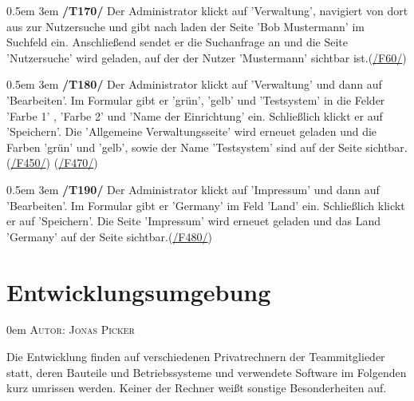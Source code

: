 \documentclass{article}
\makeatletter
\newcommand{\sectionauthor}[1]{
	{\parindent 0em \large \scshape Autor: #1 \par \nobreak \vspace*{2em}}
	\@afterheading
}
\newcommand{\specification}[3]{
	{\parindent 0.5em \hangindent 3em \hypertarget{spec:#1:#2}{\textbf{/#1#2/}} #3 \par \nobreak \vspace*{0.5em}}
}
\makeatother
\begin{document}
\specification{T}{170}{Der Administrator klickt auf 'Verwaltung', navigiert von dort aus zur Nutzersuche und gibt nach laden der Seite 'Bob Mustermann' im Suchfeld ein. Anschließend sendet er die Suchanfrage an und die Seite 'Nutzersuche' wird geladen, auf der der Nutzer 'Mustermann' sichtbar ist.(\hyperlink{spec:F:60}{/F60/})}
\specification{T}{180}{Der Administrator klickt auf 'Verwaltung' und dann auf 'Bearbeiten'. Im Formular gibt er 'grün', 'gelb' und 'Testsystem' in die Felder 'Farbe 1' , 'Farbe 2' und 'Name der Einrichtung' ein. Schließlich klickt er auf 'Speichern'. Die 'Allgemeine Verwaltungsseite' wird erneuet geladen und die Farben 'grün' und 'gelb', sowie der Name 'Testsystem' sind auf der Seite sichtbar. (\hyperlink{spec:F:450}{/F450/}) (\hyperlink{spec:F:470}{/F470/})}
\specification{T}{190}{Der Administrator klickt auf 'Impressum' und dann auf 'Bearbeiten'. Im Formular gibt er 'Germany' im Feld 'Land' ein. Schließlich klickt er auf 'Speichern'. Die Seite 'Impressum' wird erneuet geladen und das Land 'Germany' auf der Seite sichtbar.(\hyperlink{spec:F:480}{/F480/})}

\section{Entwicklungsumgebung} %
\sectionauthor{Jonas Picker}
Die Entwicklung finden auf verschiedenen Privatrechnern der Teammitglieder statt, deren Bauteile und Betriebssysteme und verwendete Software im Folgenden kurz umrissen werden. Keiner der Rechner weißt sonstige Besonderheiten auf.
\end{document}
